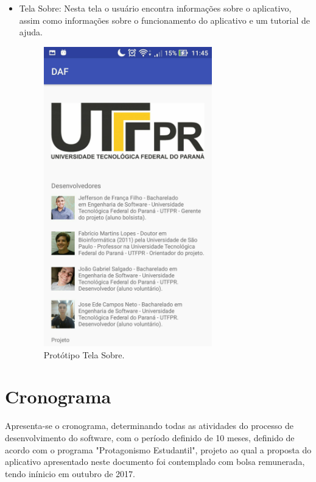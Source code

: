 \begin{itemize}
	\item  Tela Sobre: Nesta tela o usu\'ario encontra informa\c{c}\~oes sobre o aplicativo, assim como informa\c{c}\~oes sobre o funcionamento do aplicativo e um tutorial de ajuda. 
	\begin{figure}[H]
		\centering
		\caption[Prot\'otipo Tela Sobre]{Prot\'otipo Tela Sobre. \label{fig:prototiposobre}}
		\includegraphics[height=13cm]{./Figuras/prototipo_sobre.jpg}%
	\end{figure}
\end{itemize}

\section{Cronograma}

Apresenta-se o cronograma, determinando todas as atividades do processo de desenvolvimento do software, com o per\'iodo definido de 10 meses, definido de acordo com o programa "Protagonismo Estudantil", projeto ao qual a proposta do aplicativo apresentado neste documento foi contemplado com bolsa remunerada, tendo in\'inicio em outubro de 2017. 

